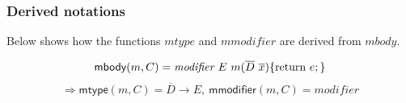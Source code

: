 \subsubsection{Derived notations}

 Below shows how the functions $mtype$ and $mmodifier$ are derived from $mbody$.

\[ \textsf{mbody}(m,C) = \textit{modifier } E \  m(\overline{D} \  \overline{x}) \{ \text{return } e; \} \] \[ \Rightarrow \textsf{mtype}(m,C) = \overline{D} \to E,\ \textsf{mmodifier}(m,C) = \textit{modifier}\]


